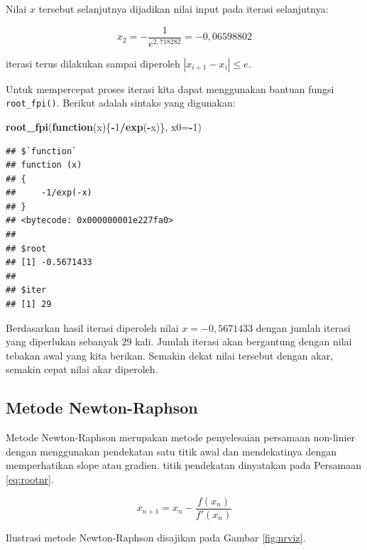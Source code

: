 \documentclass[]{book}
\newenvironment{Shaded}{\begin{snugshade}}{\end{snugshade}}
\newcommand{\ControlFlowTok}[1]{\textcolor[rgb]{0.13,0.29,0.53}{\textbf{#1}}}
\newcommand{\DataTypeTok}[1]{\textcolor[rgb]{0.13,0.29,0.53}{#1}}
\newcommand{\DecValTok}[1]{\textcolor[rgb]{0.00,0.00,0.81}{#1}}
\newcommand{\KeywordTok}[1]{\textcolor[rgb]{0.13,0.29,0.53}{\textbf{#1}}}
\newcommand{\NormalTok}[1]{#1}
\newcommand{\OperatorTok}[1]{\textcolor[rgb]{0.81,0.36,0.00}{\textbf{#1}}}
\theoremstyle{definition}
\theoremstyle{definition}
\theoremstyle{definition}
\theoremstyle{remark}
\begin{document}
Nilai \(x\) tersebut selanjutnya dijadikan nilai input pada iterasi selanjutnya:

\[
x_2 = -\frac{1}{e^{2,718282}}=-0,06598802
\]

iterasi terus dilakukan sampai diperoleh \(\left| x_{i+1}-x_i \right|\le e\).

Untuk mempercepat proses iterasi kita dapat menggunakan bantuan fungsi \texttt{root\_fpi()}. Berikut adalah sintaks yang digunakan:

\begin{Shaded}
\begin{Highlighting}[]
\KeywordTok{root_fpi}\NormalTok{(}\ControlFlowTok{function}\NormalTok{(x)\{}\OperatorTok{-}\DecValTok{1}\OperatorTok{/}\KeywordTok{exp}\NormalTok{(}\OperatorTok{-}\NormalTok{x)\}, }\DataTypeTok{x0=}\OperatorTok{-}\DecValTok{1}\NormalTok{)}
\end{Highlighting}
\end{Shaded}

\begin{verbatim}
## $`function`
## function (x) 
## {
##     -1/exp(-x)
## }
## <bytecode: 0x000000001e227fa0>
## 
## $root
## [1] -0.5671433
## 
## $iter
## [1] 29
\end{verbatim}

Berdasarkan hasil iterasi diperoleh nilai \(x=-0,5671433\) dengan jumlah iterasi yang diperlukan sebanyak \(29\) kali. Jumlah iterasi akan bergantung dengan nilai tebakan awal yang kita berikan. Semakin dekat nilai tersebut dengan akar, semakin cepat nilai akar diperoleh.

\hypertarget{newtonraphson}{%
\subsection{Metode Newton-Raphson}\label{newtonraphson}}

Metode Newton-Raphson merupakan metode penyelesaian persamaan non-linier dengan menggunakan pendekatan satu titik awal dan mendekatinya dengan memperhatikan slope atau gradien. titik pendekatan dinyatakan pada Persamaan \eqref{eq:rootnr}.

\begin{equation}
x_{n+1}=x_n-\frac{f\left(x_n\right)}{f'\left(x_n\right)}
  \label{eq:rootnr}
\end{equation}

Ilustrasi metode Newton-Raphson disajikan pada Gambar \ref{fig:nrviz}.
\end{document}

